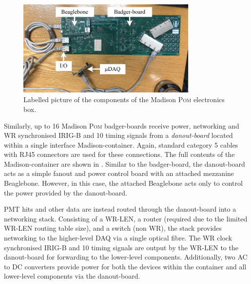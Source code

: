 \begin{figure} %
    \includegraphics[width=0.8\textwidth]{diagrams/5-daq/madison_plane.pdf}
    \caption[Labelled picture of the components of the Madison \textsc{Pom} electronics box]
    {Labelled picture of the components of the Madison \textsc{Pom} electronics box.}
    \label{fig:madison_plane}
\end{figure}

Similarly, up to 16 Madison \textsc{Pom} badger-boards receive power, networking and WR
synchronised IRIG-B and \unit{10}{} timing signals from a \emph{danout-board} located
within a single interface Madison-container. Again, standard category 5 cables with RJ45
connectors are used for these connections. The full contents of the Madison-container are shown in
. Similar to the badger-board, the danout-board acts as a simple fanout
and power control board with an attached mezzanine Beaglebone. However, in this case, the attached
Beaglebone acts only to control the power provided by the danout-board.

PMT hits and other data are instead routed through the danout-board into a networking stack.
Consisting of a WR-LEN, a router (required due to the limited WR-LEN routing table size), and a
switch (non WR), the stack provides networking to the higher-level DAQ via a single optical fibre.
The WR clock synchronised IRIG-B and \unit{10}{} timing signals are output by the WR-LEN
to the danout-board for forwarding to the lower-level components. Additionally, two AC to DC
converters provide power for both the devices within the container and all lower-level components
via the danout-board.

